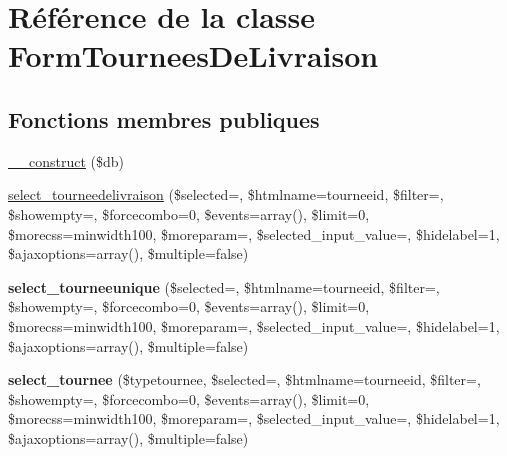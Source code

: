 \hypertarget{classFormTourneesDeLivraison}{}\section{Référence de la classe Form\+Tournees\+De\+Livraison}
\label{classFormTourneesDeLivraison}
\subsection*{Fonctions membres publiques}
\begin{DoxyCompactItemize}
\item 
\hyperlink{classFormTourneesDeLivraison_ab571c9fb5c80eed632b903160ec6ca07}{\+\_\+\+\_\+construct} (\$db)
\item 
\hyperlink{classFormTourneesDeLivraison_a6995f384af7f1508980011374e90cc6c}{select\+\_\+tourneedelivraison} (\$selected=\textquotesingle{}\textquotesingle{}, \$htmlname=\textquotesingle{}tourneeid\textquotesingle{}, \$filter=\textquotesingle{}\textquotesingle{}, \$showempty=\textquotesingle{}\textquotesingle{}, \$forcecombo=0, \$events=array(), \$limit=0, \$morecss=\textquotesingle{}minwidth100\textquotesingle{}, \$moreparam=\textquotesingle{}\textquotesingle{}, \$selected\+\_\+input\+\_\+value=\textquotesingle{}\textquotesingle{}, \$hidelabel=1, \$ajaxoptions=array(), \$multiple=false)
\item 
\mbox{\label{classFormTourneesDeLivraison_af6518f144fe18e6d00af73d5130607c1}} 
{\bfseries select\+\_\+tourneeunique} (\$selected=\textquotesingle{}\textquotesingle{}, \$htmlname=\textquotesingle{}tourneeid\textquotesingle{}, \$filter=\textquotesingle{}\textquotesingle{}, \$showempty=\textquotesingle{}\textquotesingle{}, \$forcecombo=0, \$events=array(), \$limit=0, \$morecss=\textquotesingle{}minwidth100\textquotesingle{}, \$moreparam=\textquotesingle{}\textquotesingle{}, \$selected\+\_\+input\+\_\+value=\textquotesingle{}\textquotesingle{}, \$hidelabel=1, \$ajaxoptions=array(), \$multiple=false)
\item 
\mbox{\label{classFormTourneesDeLivraison_a9c745a144f3db2e1eff92a4214251385}} 
{\bfseries select\+\_\+tournee} (\$typetournee, \$selected=\textquotesingle{}\textquotesingle{}, \$htmlname=\textquotesingle{}tourneeid\textquotesingle{}, \$filter=\textquotesingle{}\textquotesingle{}, \$showempty=\textquotesingle{}\textquotesingle{}, \$forcecombo=0, \$events=array(), \$limit=0, \$morecss=\textquotesingle{}minwidth100\textquotesingle{}, \$moreparam=\textquotesingle{}\textquotesingle{}, \$selected\+\_\+input\+\_\+value=\textquotesingle{}\textquotesingle{}, \$hidelabel=1, \$ajaxoptions=array(), \$multiple=false)

\end{DoxyCompactItemize}
